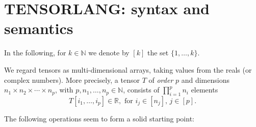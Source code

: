\section{TENSORLANG: syntax and semantics}\label{sec:tensorlang}

In the following, for $k\in\mathbb{N}$ we denote by $[k]$ the set $\{1,\ldots,k\}$.

We regard tensors as multi-dimensional arrays, taking values from the reals (or complex numbers).
More precisely, a tensor $T$ of \textit{order} $p$ and dimensions $n_1\times n_2\times\cdots\times n_p$,
with $p,n_1,\ldots,n_p\in \mathbb{N}$, consists of $\prod_{i=1}^p n_i$ elements
$$T[i_1,\ldots,i_p]\in\mathbb{R}, \text{ for $i_j\in [n_j]$, $j\in[p]$}.$$

The following operations seem to form a solid starting point:

